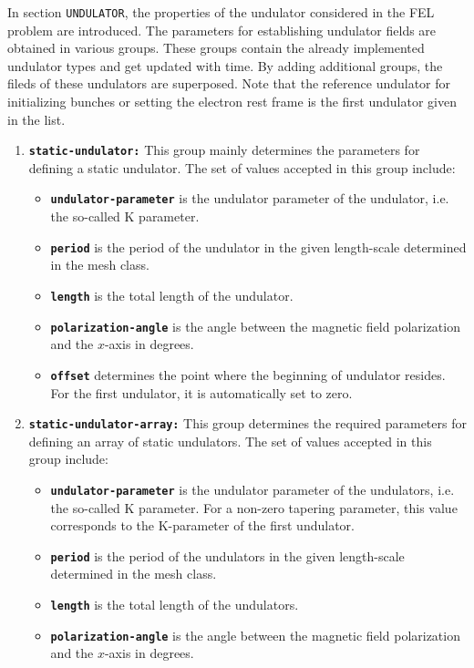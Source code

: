 In section \texttt{UNDULATOR}, the properties of the undulator considered in the FEL problem are introduced.
%
The parameters for establishing undulator fields are obtained in various groups.
%
These groups contain the already implemented undulator types and get updated with time.
%
By adding additional groups, the fileds of these undulators are superposed.
%
Note that the reference undulator for initializing bunches or setting the electron rest frame is the first undulator given in the list.

\begin{enumerate}
\item \textbf{\texttt{static-undulator:}} This group mainly determines the parameters for defining a static undulator. The set of values accepted in this group include:
\begin{itemize}
	\item \textbf{\texttt{undulator-parameter}} is the undulator parameter of the undulator, i.e. the so-called K parameter.
	\item \textbf{\texttt{period}} is the period of the undulator in the given length-scale determined in the mesh class.
	\item \textbf{\texttt{length}} is the total length of the undulator.
    \item \textbf{\texttt{polarization-angle}} is the angle between the magnetic field polarization and the $x$-axis in degrees.
    \item \textbf{\texttt{offset}} determines the point where the beginning of undulator resides. For the first undulator, it is automatically set to zero.
\end{itemize}
\item \textbf{\texttt{static-undulator-array:}} This group determines the required parameters for defining an array of static undulators. The set of values accepted in this group include:
\begin{itemize}
	\item \textbf{\texttt{undulator-parameter}} is the undulator parameter of the undulators, i.e. the so-called K parameter. For a non-zero tapering parameter, this value corresponds to the K-parameter of the first undulator.
	\item \textbf{\texttt{period}} is the period of the undulators in the given length-scale determined in the mesh class.
	\item \textbf{\texttt{length}} is the total length of the undulators.
	\item \textbf{\texttt{polarization-angle}} is the angle between the magnetic field polarization and the $x$-axis in degrees.

\end{itemize}
\end{enumerate}
